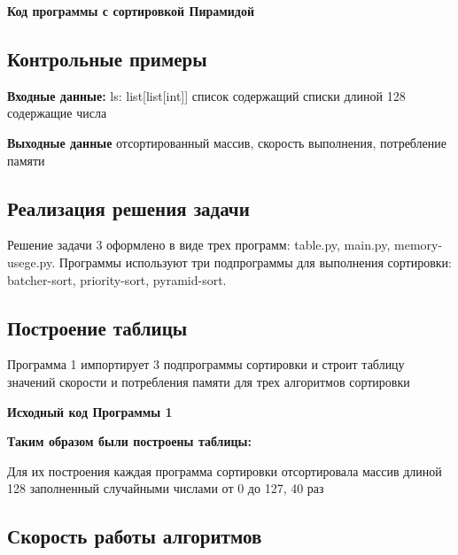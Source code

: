 \textbf{Код программы с сортировкой Пирамидой}




\subsection{Контрольные примеры}
\textbf{Входные данные:}
ls: list[list[int]] список содержащий списки длиной 128 содержащие числа

\textbf{Выходные данные}
отсортированный массив, скорость выполнения, потребление памяти



\subsection{Реализация решения задачи}

Решение задачи 3 оформлено в виде трех программ: table.py, main.py, memory-usege.py. Программы используют три подпрограммы для выполнения сортировки: batcher-sort, priority-sort, pyramid-sort.


\subsection{Построение таблицы}


Программа 1 импортирует 3 подпрограммы сортировки и строит таблицу значений скорости и потребления памяти для трех алгоритмов сортировки

\textbf{Исходный код Программы 1}




\textbf{Таким образом были построены таблицы:}








Для их построения каждая программа сортировки отсортировала массив длиной 128 заполненный случайными числами от 0 до 127, 40 раз















\subsection{Скорость работы алгоритмов}




